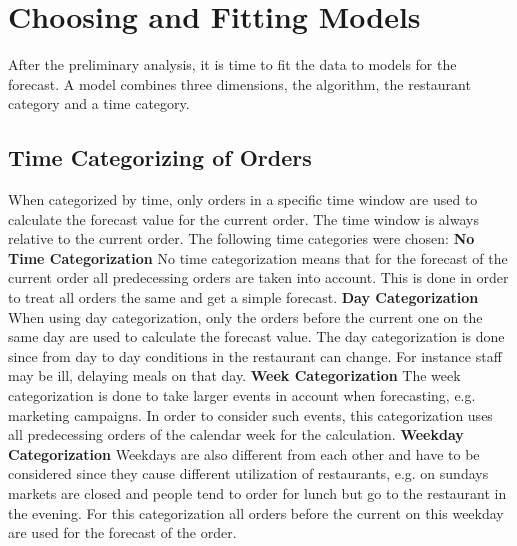 \section{Choosing and Fitting Models}\label{Choosing and Fitting Models}
After the preliminary analysis, it is time to fit the data to models for the forecast. A model combines three dimensions, the algorithm, the restaurant category and a time category.
\subsection{Time Categorizing of Orders}\label{subsection:Categorizing by Order}
When categorized by time, only orders in a specific time window are used to calculate the forecast value for the current order. The time window is always relative to the current order. The following time categories were chosen:
\newline\newline\textbf{No Time Categorization}\newline
No time categorization means that for the forecast of the current order all predecessing orders are taken into account. This is done in order to treat all orders the same and get a simple forecast.
\newline\newline\textbf{Day Categorization}\newline
When using day categorization, only the orders before the current one on the same day are used to calculate the forecast value. The day categorization is done since from day to day conditions in the restaurant can change. For instance staff may be ill, delaying meals on that day.
\newline\newline\textbf{Week Categorization}\newline
The week categorization is done to take larger events in account when forecasting, e.g. marketing campaigns. In order to consider such events, this categorization uses all predecessing orders of the calendar week for the calculation.
\newline\newline\textbf{Weekday Categorization}\newline
Weekdays are also different from each other and have to be considered since they cause different utilization of restaurants, e.g. on sundays markets are closed and people tend to order for lunch but go to the restaurant in the evening. For this categorization all orders before the current on this weekday are used for the forecast of the order.
